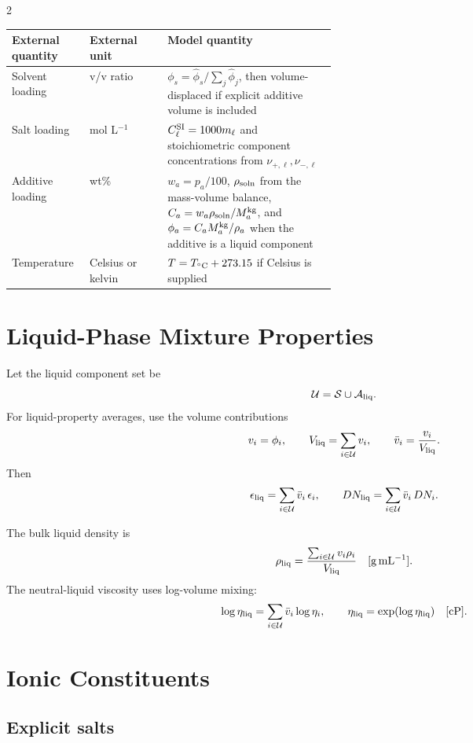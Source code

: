 \documentclass[10pt]{article}
\newcommand{\cp}{\mathrm{cP}}
\begin{document}
\begin{multicols}{2}
\begin{center}
\begin{tabularx}{\linewidth}{>{\RaggedRight\arraybackslash}p{0.24\linewidth}
>{\RaggedRight\arraybackslash}p{0.24\linewidth}
>{\RaggedRight\arraybackslash}X}
\toprule
External quantity & External unit & Model quantity \\
\midrule
Solvent loading & v/v ratio &
\(\phi_s=\widehat\phi_s/\sum_j\widehat\phi_j\), then volume-displaced if
explicit additive volume is included \\
Salt loading & mol L\(^{-1}\) &
\(C_\ell^{\rm SI}=1000m_\ell\) and stoichiometric component concentrations
from \(\nu_{+,\ell},\nu_{-,\ell}\) \\
Additive loading & wt\% &
\(w_a=p_a/100\), \(\rho_{\rm soln}\) from the mass-volume balance,
\(C_a=w_a\rho_{\rm soln}/M_a^{\rm kg}\), and
\(\phi_a=C_aM_a^{\rm kg}/\rho_a\) when the additive is a liquid component \\
Temperature & Celsius or kelvin &
\(T=T_{{}^\circ{\rm C}}+273.15\) if Celsius is supplied \\
\bottomrule
\end{tabularx}
\end{center}

\section{Liquid-Phase Mixture Properties}

Let the liquid component set be
\[
\mathcal U = \mathcal S \cup \mathcal A_{\rm liq}.
\]
For liquid-property averages, use the volume contributions
\[
v_i=\phi_i,
\qquad
V_{\rm liq}=\sum_{i\in\mathcal U}v_i,
\qquad
\bar v_i=\frac{v_i}{V_{\rm liq}}.
\]
Then
\[
\epsilon_{\rm liq}=\sum_{i\in\mathcal U}\bar v_i\,\epsilon_i,
\qquad
DN_{\rm liq}=\sum_{i\in\mathcal U}\bar v_i\,DN_i.
\]

The bulk liquid density is
\[
\rho_{\rm liq}
=
\frac{\sum_{i\in\mathcal U} v_i\rho_i}{V_{\rm liq}}
\quad [\mathrm{g\,mL^{-1}}].
\]
The neutral-liquid viscosity uses log-volume mixing:
\[
\log \eta_{\rm liq}
=
\sum_{i\in\mathcal U}\bar v_i\log \eta_i,
\qquad
\eta_{\rm liq}=\exp(\log\eta_{\rm liq})
\quad [\cp].
\]

\section{Ionic Constituents}

\subsection{Explicit salts}


\end{multicols}
\end{document}
